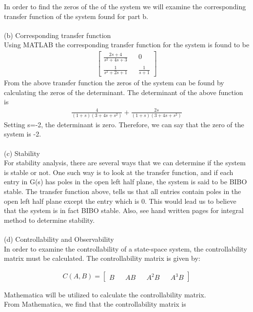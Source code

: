 \documentclass[paper=a4,margin, fontsize=11pt]{scrartcl} %
\numberwithin{equation}{section} %
\numberwithin{figure}{section} %
\numberwithin{table}{section} %
\begin{document}
In order to find the zeros of the of the system we will examine the corresponding transfer function of the system found for part b.\\ 
\\
(b) Corresponding transfer function\\
Using MATLAB the corresponding transfer function for the system is found to be
\begin{align*}
\begin{bmatrix}
\frac{2s+4}{s^2+4s+3} && 0\\\frac{1}{s^2+2s+1} && \frac{1}{s+1}
\end{bmatrix}
\end{align*}
From the above transfer function the zeros of the system can be found by calculating the zeros of the determinant.  The determinant of the above function is 
\begin{align*}
\frac{4}{(1+s)(3+4s+s^2)}+\frac{2s}{(1+s)(3+4s+s^2)}
\end{align*}
Setting s=-2, the determinant is zero.  Therefore, we can say that the zero of the system is -2.\\
\\
(c) Stability\\
For stability analysis, there are several ways that we can determine if the system is stable or not.  One such way is to look at the transfer function, and if each entry in G(s) has poles in the open left half plane, the system is said to be BIBO stable.  The transfer function above, tells us that all entries contain poles in the open left half plane except the entry which is 0.  This would lead us to believe that the system is in fact BIBO stable.  Also, see hand written pages for integral method to determine stability.\\
\\ 
(d) Controllability and Observability\\
In order to examine the controllability of a state-space system, the controllability matrix must be calculated.  The controllability matrix is given by:

\begin{align*}
C(A,B)=\begin{bmatrix}B && AB && A^2B && A^3B\end{bmatrix}
\end{align*}

Mathematica will be utilized to calculate the controllability matrix.\\
From Mathematica, we find that the controllability matrix is
\end{document}

